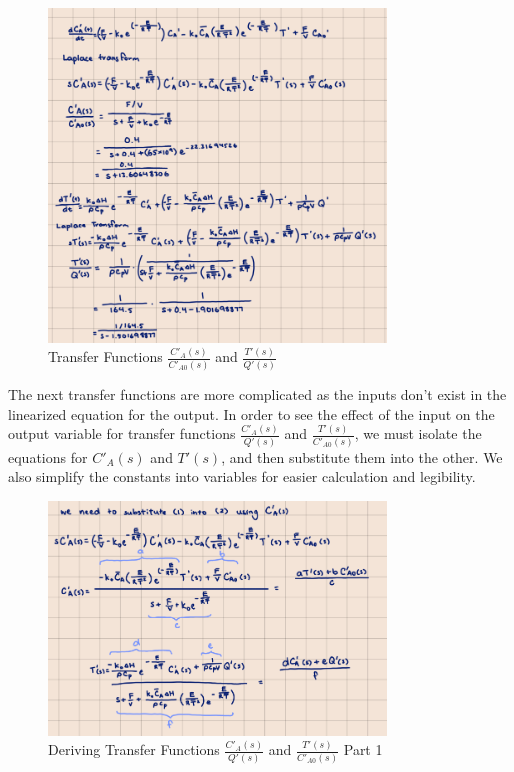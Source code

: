 \documentclass[12pt]{article}
\begin{document}
\begin{enumerate}
\begin{enumerate}
    \begin{figure}[H]
      \centering
      \includegraphics[width=0.8\textwidth]{Figures/handcalc/figure4-4a.png}
      \caption{Transfer Functions $\frac{C'_A(s)}{C'_{A0}(s)}$ and $\frac{T'(s)}{Q'(s)}$}
      \label{fig:figure45}
    \end{figure}

    The next transfer functions are more complicated as the inputs don't exist in the linearized equation for the output. In order to see the effect of the input on the output variable for transfer functions $\frac{C'_A(s)}{Q'(s)}$ and $\frac{T'(s)}{C'_{A0}(s)}$, we must isolate the equations for $C'_A(s)$ and $T'(s)$, and then substitute them into the other. We also simplify the constants into variables for easier calculation and legibility.

    \begin{figure}[H]
      \centering
      \includegraphics[width=0.8\textwidth]{Figures/handcalc/figure4-4b.png}
      \caption{Deriving Transfer Functions $\frac{C'_A(s)}{Q'(s)}$ and $\frac{T'(s)}{C'_{A0}(s)}$ Part 1}
      \label{fig:figure46}
    \end{figure}


\end{enumerate}
\end{enumerate}
\end{document}
